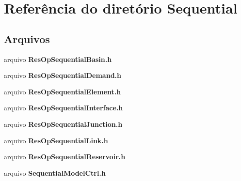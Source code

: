 \section{Referência do diretório Sequential}
\label{dir_cb009cdeb8fdbf24441f49daa0b01441}
\subsection*{Arquivos}
\begin{DoxyCompactItemize}
\item 
arquivo {\bf Res\+Op\+Sequential\+Basin.\+h}
\item 
arquivo {\bf Res\+Op\+Sequential\+Demand.\+h}
\item 
arquivo {\bf Res\+Op\+Sequential\+Element.\+h}
\item 
arquivo {\bf Res\+Op\+Sequential\+Interface.\+h}
\item 
arquivo {\bf Res\+Op\+Sequential\+Junction.\+h}
\item 
arquivo {\bf Res\+Op\+Sequential\+Link.\+h}
\item 
arquivo {\bf Res\+Op\+Sequential\+Reservoir.\+h}
\item 
arquivo {\bf Sequential\+Model\+Ctrl.\+h}
\end{DoxyCompactItemize}

